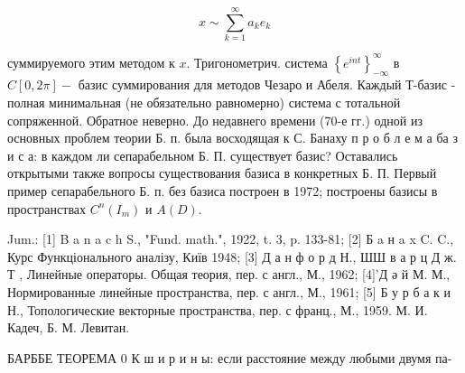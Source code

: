 \documentclass[10pt]{article}
\begin{document}
\[

x \sim \sum_{k=1}^{\infty} a_{k} e_{k}

\]



суммируемого этим методом к $x$. Тригонометрич. система $\left\{e^{i n t}\right\}_{-\infty}^{\infty}$ в $C[0,2 \pi]-$ базис суммирования для методов Чезаро и Абеля. Каждый Т-базис - полная минимальная (не обязательно равномерно) система с тотальной сопряженной. Обратное неверно. До недавнего времени (70-е гг.) одной из основных проблем теории Б. п. была восходящая к С. Банаху п р о б л е м а ба з и с а: в каждом ли сепарабельном Б. П. существует базис? Оставались открытыми также вопросы существования базиса в конкретных Б. П. Первый пример сепарабельного Б. п. без базиса построен в 1972; построены базисы в пространствах $C^{n}\left(I_{m}\right)$ и $A(D)$.



Jum.: [1] B a n a c h S., "Fund. math.", 1922, t. 3, p. 133-81; [2] Б a н a x C. C., Курс Функціонального аналізу, Київ 1948; [3] Д а н ф о р д Н., ШШ в а р ц Д ж. Т , Линейные операторы. Общая теория, пер. с англ., М., 1962; [4]'Д ә й М. М., Нормированные линейные пространства, пер. с англ., М., 1961; [5] Б у р б а к и Н., Топологические векторные пространства, пер. с франц., М., 1959. М. И. Кадеч, Б. М. Левитан.



БАРББЕ ТЕОРЕМА 0 К ш и р и н ы: если расстояние между любыми двумя па-
\end{document}
